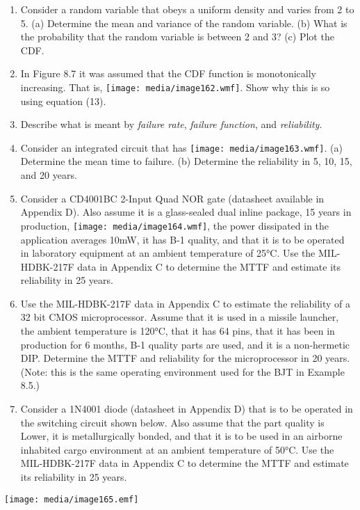 \begin{enumerate}
\def\labelenumi{\arabic{enumi}.}
\item
  Consider a random variable that obeys a uniform density and varies
  from 2 to 5. (a) Determine the mean and variance of the random
  variable. (b) What is the probability that the random variable is
  between 2 and 3? (c) Plot the CDF.
\item
  In Figure 8.7 it was assumed that the CDF function is monotonically
  increasing. That is, \texttt{[image: media/image162.wmf]}. Show why
  this is so using equation (13).
\item
  Describe what is meant by \emph{failure rate}, \emph{failure
  function}, and \emph{reliability}.
\item
  Consider an integrated circuit that has
  \texttt{[image: media/image163.wmf]}. (a) Determine the mean time to
  failure. (b) Determine the reliability in 5, 10, 15, and 20 years.
\item
  Consider a CD4001BC 2-Input Quad NOR gate (datasheet available in
  Appendix D). Also assume it is a glass-sealed dual inline package, 15
  years in production, \texttt{[image: media/image164.wmf]}, the power
  dissipated in the application averages 10mW, it has B-1 quality, and
  that it is to be operated in laboratory equipment at an ambient
  temperature of 25°C. Use the MIL-HDBK-217F data in Appendix C to
  determine the MTTF and estimate its reliability in 25 years.
\item
  Use the MIL-HDBK-217F data in Appendix C to estimate the reliability
  of a 32 bit CMOS microprocessor. Assume that it is used in a missile
  launcher, the ambient temperature is 120°C, that it has 64 pins, that
  it has been in production for 6 months, B-1 quality parts are used,
  and it is a non-hermetic DIP. Determine the MTTF and reliability for
  the microprocessor in 20 years. (Note: this is the same operating
  environment used for the BJT in Example 8.5.)
\item
  Consider a 1N4001 diode (datasheet in Appendix D) that is to be
  operated in the switching circuit shown below. Also assume that the
  part quality is Lower, it is metallurgically bonded, and that it is to
  be used in an airborne inhabited cargo environment at an ambient
  temperature of 50°C. Use the MIL-HDBK-217F data in Appendix C to
  determine the MTTF and estimate its reliability in 25 years.
\end{enumerate}

\texttt{[image: media/image165.emf]}

